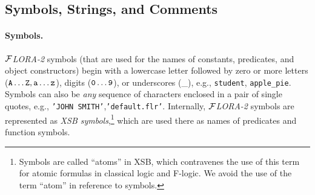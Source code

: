 \documentclass[11pt]{article}
\newcommand{\FLORA}{{\mbox{${\cal F}${\small\it LORA}\rm\emph{-2}}}\xspace}
\newcommand{\fl}{\mbox{F-logic}\xspace}
\begin{document}
\subsection{Symbols, Strings, and Comments}


\paragraph{Symbols.}
\FLORA symbols (that are used for the names of constants, predicates, and
object constructors) begin with a lowercase letter followed by zero or more
letters ($\tt A \ldots Z, a \ldots z$), digits ($\tt 0 \ldots 9$), or underscores
(\_), e.g., \texttt{student}, \texttt{apple\_pie}. Symbols can also be
\emph{any} sequence of characters enclosed in a pair of single quotes,
e.g., \texttt{'JOHN SMITH'},\texttt{'default.flr'}.  Internally, \FLORA
symbols are represented as \emph{XSB symbols},\footnote{
  Symbols are called ``atoms'' in XSB, which contravenes the use of this
  term for atomic formulas in classical logic and \fl.
  We avoid the use of the term ``atom'' in reference to symbols.
  }
which are used there as names of predicates and function symbols.
\end{document}
